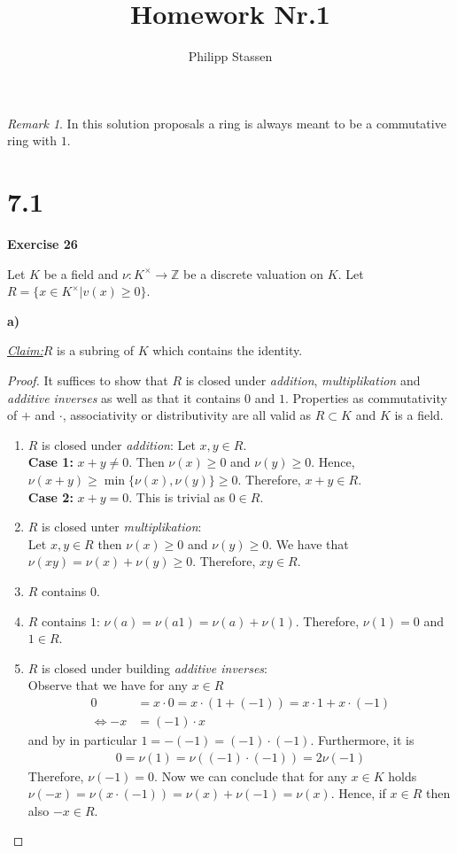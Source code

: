 \documentclass{article}
\title{Homework Nr.1}
\author{Philipp Stassen}
\newcommand{\Z}{\mathbb{Z}}
\newcommand{\claim}
{\underline{\textit{Claim:}}\hspace{0,2cm}}
\newcommand{\aufgabe}[1]{
{
	\vspace*{0.5cm}
	\noindent\textsf{\textbf{Exercise #1}}
	\vspace*{0.2cm}

}
}
\newcommand{\teilaufgabe}[1]{
{       

	\noindent\hspace*{0,1 cm}\textbf{#1)}
}
}
\theoremstyle{definition}
\theoremstyle{plain}
\theoremstyle{remark}
\newtheorem*{silentremark}{Remark}
\begin{document}
\maketitle
\begin{silentremark}
	In this solution proposals a ring is always meant to be a commutative ring with $1$.
\end{silentremark}
\section*{7.1}
\aufgabe{26} Let $K$ be a field and $\nu:K^{\times}\rightarrow\Z$ be a discrete valuation on $K$. Let $R = \{x\in K^{\times} | v(x) \geq 0\}$.

\teilaufgabe{a} \claim $R$ is a subring of $K$ which contains the identity.
\begin{proof}
	It suffices to show that $R$ is closed under \textit{addition}, \textit{multiplikation} and \textit{additive inverses} as well as that it contains $0$ and $1$. Properties as commutativity of $+$ and $\cdot$, associativity or distributivity are all valid as $R \subset K$ and $K$ is a field.
\begin{enumerate}
	\item $R$ is closed under \textit{addition}:
		Let $x,y\in R$. \\
		\textbf{Case 1:} $x+y \neq 0$. Then $\nu(x)\geq 0$ and $\nu(y)\geq 0$. 
		Hence, $\nu(x+y)\geq \min\{\nu(x),\nu(y)\}\geq 0$. Therefore, $x+y\in R$. \\
		\textbf{Case 2:} $x+y = 0$. This is trivial as $0\in R$.
	\item $R$ is closed unter \textit{multiplikation}:\\
		Let $x,y\in R$ then $\nu(x)\geq 0$ and $\nu(y)\geq 0$. 
		We have that $\nu(xy) = \nu(x) + \nu(y) \geq 0$. Therefore, $xy\in R$.
	\item $R$ contains $0$.
	\item $R$ contains $1$:
		$\nu (a) = \nu (a 1) = \nu(a) +\nu(1)$. Therefore, $\nu(1) = 0$ and $1\in R$.
	\item $R$ is closed under building \textit{additive inverses}: \\
		Observe that we have for any $x\in R$
		\begin{align}
			0 &= x \cdot 0 = x \cdot (1 + (-1)) = x\cdot 1 + x\cdot (-1) \\
			\Longleftrightarrow  -x &= (-1)\cdot x
		\end{align}
		and by in particular $1=-(-1)= (-1)\cdot (-1)$.
		Furthermore, it is
		\begin{align}
			0=\nu(1) = \nu((-1)\cdot (-1)) = 2\nu(-1)
		\end{align}
		Therefore, $\nu(-1)=0$.
		Now we can conclude that for any $x\in K$ holds $\nu(-x) = \nu(x\cdot (-1)) = \nu(x) + \nu(-1) = \nu(x)$. Hence, if $x\in R$ then also $-x\in R$.
\end{enumerate}
\end{proof}
\end{document}
